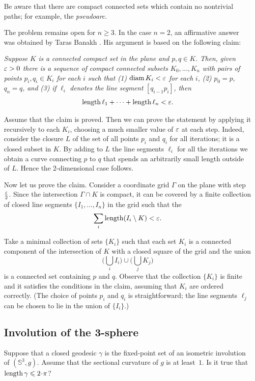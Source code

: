Be aware that there are compact connected sets which contain no nontrivial paths; for example, the \emph{pseudoarc}.

The problem remains open for $n\ge 3$.
In the case $n=2$, an affirmative answer was obtained by Taras Banakh \cite{banakh}.
His argument is based on the following claim:

\textit{Suppose $K$ is a connected compact set in the plane and $p,q\in K$.
 Then, given $\varepsilon>0$ there is a sequence of compact connected subsets $K_0,\dots, K_n$
 with pairs of points $p_i,q_i\in K_i$ for each $i$ such that
(1) $\operatorname{\rm diam}\nolimits K_i<\varepsilon$ for each $i$,
(2) $p_0=p$, $q_n=q$, and
(3) if $\ell_i$ denotes the line segment $[q_{i-1}p_i]$, then
 \[\operatorname{\rm length} \ell_1+\dots+\operatorname{\rm length} \ell_n<\varepsilon.\]}

Assume that the claim is proved.
Then we can prove the statement by applying it recursively to each $K_i$, choosing a much smaller value of $\varepsilon$ at each step.
Indeed, consider the closure $L$ of the set of all points $p_i$ and $q_i$ for all iterations; it is a closed subset in $K$.
By adding to $L$ the line segments $\ell_i$ for all the iterations we obtain a curve connecting $p$ to $q$ that spends an arbitrarily small length outside of $L$.
Hence the 2-dimensional case follows.

Now let us prove the claim.
Consider a coordinate grid $\Gamma$ on the plane with step $\tfrac{\varepsilon}2$.
Since the intersection $\Gamma\cap K$ is compact, it can be covered by a finite collection of closed line segments $\{I_1,\dots,I_n\}$ in the grid such that the
\[\sum_i\operatorname{\rm length}(I_i\setminus K)<\varepsilon.\]

Take a minimal collection of sets $\{K_i\}$ such that each set $K_i$ is a connected component of the intersection of $K$ with a closed square of the grid and the union
\[\biggl(\bigcup_i I_i\biggr)\cup\biggl(\bigcup_j K_j\biggr)\]
is a connected set containing $p$ and $q$.
Observe that the collection $\{K_i\}$ is finite and it satisfies the conditions in the claim, assuming that $K_i$ are ordered correctly.
(The choice of points $p_i$ and $q_i$ is straightforward;
the line segments $\ell_j$ can be chosen to lie in the union of $\{I_i\}$.)

\subsection{Involution of the 3-sphere}

\begin{pr}
Suppose that a closed geodesic $\gamma$ is the fixed-point set of an isometric involution of $(\mathbb{S}^3,g)$.
Assume that the sectional curvature of $g$ is at least~$1$.
Is it true that $\length\gamma\le2\cdot\pi$?
\end{pr}

